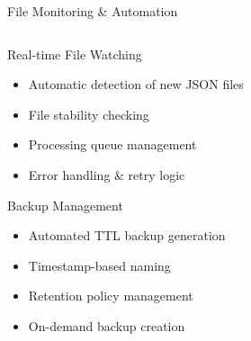 \documentclass[aspectratio=169]{beamer}
\begin{document}
\begin{frame}{File Monitoring \& Automation}
    \begin{columns}[c]
        \begin{column}{0.5\textwidth}
            \begin{block}{Real-time File Watching}
                \begin{itemize}
                    \item Automatic detection of new JSON files
                    \item File stability checking
                    \item Processing queue management
                    \item Error handling \& retry logic
                \end{itemize}
            \end{block}
            
            \begin{block}{Backup Management}
                \begin{itemize}
                    \item Automated TTL backup generation
                    \item Timestamp-based naming
                    \item Retention policy management
                    \item On-demand backup creation
                \end{itemize}
            \end{block}
        \end{column}
        \begin{column}{0.5\textwidth}
            \begin{center}
\end{center}
\end{column}
\end{columns}
\end{frame}
\end{document}
